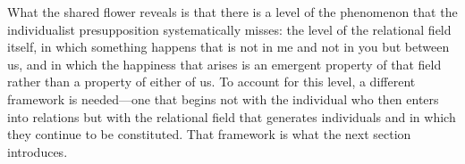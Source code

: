 What the shared flower reveals is that there is a level of the phenomenon that the individualist presupposition systematically misses: the level of the relational field itself, in which something happens that is not in me and not in you but between us, and in which the happiness that arises is an emergent property of that field rather than a property of either of us. To account for this level, a different framework is needed---one that begins not with the individual who then enters into relations but with the relational field that generates individuals and in which they continue to be constituted. That framework is what the next section introduces.
